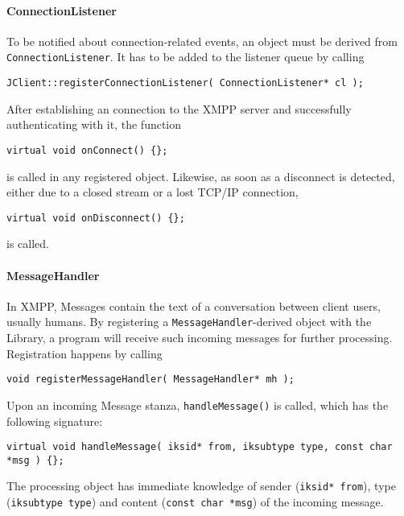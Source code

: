 \paragraph{ConnectionListener}
To be notified about connection-related events, an object must be derived from \texttt{ConnectionListener}. It has to be added to the listener queue by calling
\begin{flushleft}
\texttt{JClient::registerConnectionListener( ConnectionListener* cl );}
\end{flushleft}
After establishing an connection to the XMPP server and successfully authenticating with it, the function
\begin{flushleft}
\texttt{virtual void onConnect() \{\};}
\end{flushleft}
is called in any registered object. Likewise, as soon as a disconnect is detected, either due to a closed stream or a lost TCP/IP connection, 
\begin{flushleft}
\texttt{virtual void onDisconnect() \{\};}
\end{flushleft}
is called.

\paragraph{MessageHandler}
In XMPP, Messages contain the text of a conversation between client users, usually humans. By registering a \texttt{MessageHandler}-derived object with the Library, a program will receive such incoming messages for further processing. Registration happens by calling
\begin{flushleft}
\texttt{void registerMessageHandler( MessageHandler* mh );}
\end{flushleft}
Upon an incoming Message stanza, \texttt{handleMessage()} is called, which has the following signature:
\begin{flushleft}
\texttt{virtual void handleMessage( iksid* from, iksubtype type, const char *msg ) \{\};}
\end{flushleft}
The processing object has immediate knowledge of sender (\texttt{iksid* from}), type (\texttt{iksubtype type}) and content (\texttt{const char *msg}) of the incoming message.

